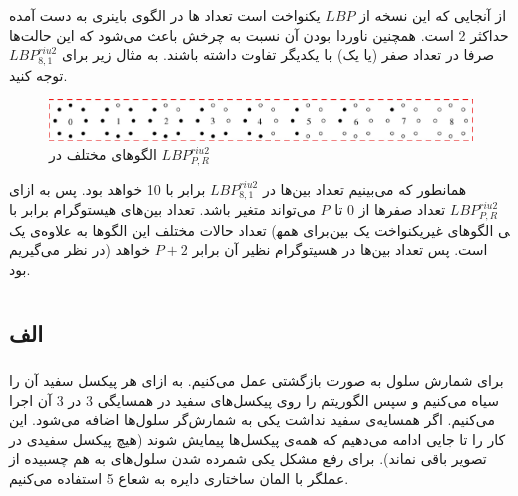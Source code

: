 \documentclass{article}
\begin{document}


\newpage


\section{}%
از آنجایی که این نسخه از $LBP$ یکنواخت است تعداد ها در الگوی باینری به دست آمده حداکثر 2 است. همچنین ناوردا بودن آن نسبت به چرخش باعث می‌شود که این حالت‌ها صرفا در تعداد صفر (یا یک) با یکدیگر تفاوت داشته باشند. به مثال زیر برای $LBP_{8,1}^{riu2}$ توجه کنید.
\begin{figure}[H]
    \centering
    \includegraphics[width=1.0\textwidth]{figures/1.jpg}
    \caption
	{
الگوهای مختلف در $LBP_{P,R}^{riu2}$
	}
    \label{fig:fig1}
\end{figure}
همانطور که می‌بینیم تعداد بین‌ها در $LBP_{8,1}^{riu2}$ برابر با 10 خواهد بود. پس به ازای $LBP_{P,R}^{riu2}$ تعداد صفرها از $0$ تا $P$ می‌تواند متغیر باشد. تعداد بین‌های هیستوگرام برابر با تعداد حالات مختلف این الگوها به علاوه‌ی یک (برای همه‎ی الگوهای غیریکنواخت یک بین در نظر می‌گیریم) است. پس تعداد بین‌ها در هسیتوگرام نظیر آن برابر
$P+2$
خواهد بود.

\section{}%
\subsection{الف}
\subsubsection{}
برای شمارش سلول به صورت بازگشتی عمل می‌کنیم. به ازای هر پیکسل سفید آن را سیاه می‌کنیم و سپس الگوریتم را روی پیکسل‌های سفید در همسایگی 3 در 3 آن اجرا می‌کنیم. اگر همسایه‌ی سفید نداشت یکی به شمارش‌گر سلول‌ها اضافه می‌شود. این کار را تا جایی ادامه می‌دهیم که همه‌ی پیکسل‌ها پیمایش شوند (هیچ پیکسل سفیدی در تصویر باقی نماند). برای رفع مشکل یکی شمرده شدن سلول‌های به هم چسبیده از عملگر  با المان ساختاری دایره به شعاع 5 استفاده می‌کنیم.
\end{document}
